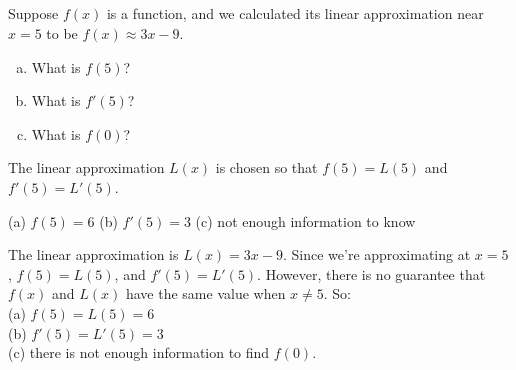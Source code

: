 %
%


\subsection*{\Conceptual}



\begin{Mquestion}
Suppose $f(x)$ is a function, and we calculated its linear approximation near $x=5$ to be
$f(x) \approx 3x-9$.
\begin{enumerate}[(a)]
\item What is $f(5)$?
\item What is $f'(5)$?
\item What is $f(0)$?
\end{enumerate}
\end{Mquestion}
\begin{hint}
The linear approximation $L(x)$ is chosen so that $f(5)=L(5)$ and $f'(5)=L'(5)$.
\end{hint}
\begin{answer}
(a) $f(5)=6$\qquad
(b) $f'(5)=3$\qquad
(c) not enough information to know
\end{answer}
\begin{solution}
The linear approximation is $L(x)=3x-9$. Since we're approximating at $x=5$, $f(5)=L(5)$, and $f'(5)=L'(5)$. However, there is no guarantee that $f(x)$ and $L(x)$ have the same value when $x \neq 5$. So:\\
(a) $f(5)=L(5)=6$\\
(b) $f'(5)=L'(5)=3$\\
(c) there is not enough information to find $f(0)$.
\end{solution}


